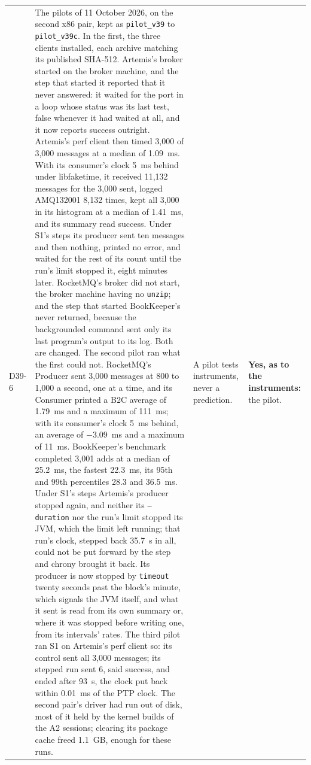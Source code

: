 \documentclass[11pt]{article}
\begin{document}
{\begin{longtable}{@{}p{1.1cm} >{\raggedright\arraybackslash}p{6.1cm} >{\raggedright\arraybackslash}p{6.0cm} >{\raggedright\arraybackslash}p{2.2cm}@{}}
D39-6 & The pilots of 11 October 2026, on the second x86 pair, kept as \texttt{pilot\_v39} to \texttt{pilot\_v39c}. In the first, the three clients installed, each archive matching its published SHA-512. Artemis's broker started on the broker machine, and the step that started it reported that it never answered: it waited for the port in a loop whose status was its last test, false whenever it had waited at all, and it now reports success outright. Artemis's perf client then timed 3,000 of 3,000 messages at a median of 1.09~ms. With its consumer's clock 5~ms behind under libfaketime, it received 11,132 messages for the 3,000 sent, logged AMQ132001 8,132 times, kept all 3,000 in its histogram at a median of 1.41~ms, and its summary read success. Under S1's steps its producer sent ten messages and then nothing, printed no error, and waited for the rest of its count until the run's limit stopped it, eight minutes later. RocketMQ's broker did not start, the broker machine having no \texttt{unzip}; and the step that started BookKeeper's never returned, because the backgrounded command sent only its last program's output to its log. Both are changed. The second pilot ran what the first could not. RocketMQ's Producer sent 3,000 messages at 800 to 1,000 a second, one at a time, and its Consumer printed a B2C average of 1.79~ms and a maximum of 111~ms; with its consumer's clock 5~ms behind, an average of $-3.09$~ms and a maximum of 11~ms. BookKeeper's benchmark completed 3,001 adds at a median of 25.2~ms, the fastest 22.3~ms, its 95th and 99th percentiles 28.3 and 36.5~ms. Under S1's steps Artemis's producer stopped again, and neither its \texttt{--duration} nor the run's limit stopped its JVM, which the limit left running; that run's clock, stepped back 35.7~s in all, could not be put forward by the step and chrony brought it back. Its producer is now stopped by \texttt{timeout} twenty seconds past the block's minute, which signals the JVM itself, and what it sent is read from its own summary or, where it was stopped before writing one, from its intervals' rates. The third pilot ran S1 on Artemis's perf client so: its control sent all 3,000 messages; its stepped run sent 6, said success, and ended after 93~s, the clock put back within 0.01~ms of the PTP clock. The second pair's driver had run out of disk, most of it held by the kernel builds of the A2 sessions; clearing its package cache freed 1.1~GB, enough for these runs. & A pilot tests instruments, never a prediction. & \textbf{Yes, as to the instruments:} the pilot. \\

\end{longtable}}
\end{document}
